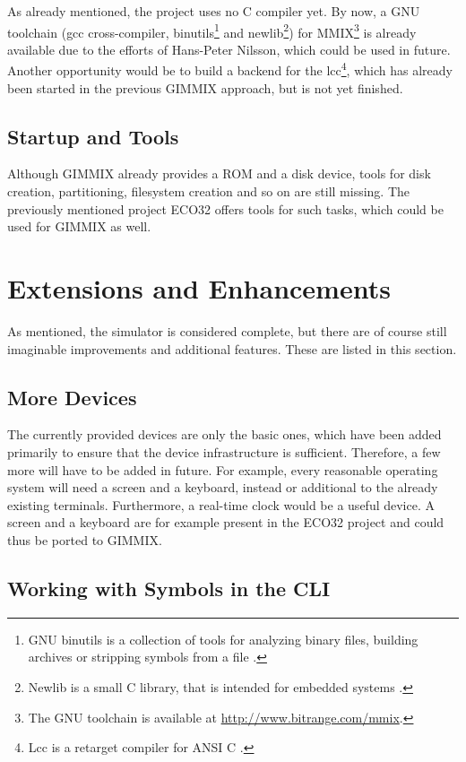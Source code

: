 As already mentioned, the project uses no C compiler yet. By now, a GNU toolchain (\gls{gcc} cross-compiler, binutils\footnote{GNU binutils is a collection of tools for analyzing binary files, building archives or stripping symbols from a file \citep{binutils}.} and newlib\footnote{Newlib is a small C library, that is intended for embedded systems \citep{newlib}.}) for MMIX\footnote{The GNU toolchain is available at \url{http://www.bitrange.com/mmix}.} is already available due to the efforts of Hans-Peter Nilsson, which could be used in future. Another opportunity would be to build a backend for the lcc\footnote{Lcc is a retarget compiler for ANSI C \citep{lcc}.}, which has already been started in the previous GIMMIX approach, but is not yet finished.

\subsection{Startup and Tools}

Although GIMMIX already provides a ROM and a disk device, tools for disk creation, partitioning, filesystem creation and so on are still missing. The previously mentioned project ECO32 offers tools for such tasks, which could be used for GIMMIX as well.

\section{Extensions and Enhancements}

As mentioned, the simulator is considered complete, but there are of course still imaginable improvements and additional features. These are listed in this section.

\subsection{More Devices}

The currently provided devices are only the basic ones, which have been added primarily to ensure that the device infrastructure is sufficient. Therefore, a few more will have to be added in future. For example, every reasonable operating system will need a screen and a keyboard, instead or additional to the already existing terminals. Furthermore, a real-time clock would be a useful device. A screen and a keyboard are for example present in the ECO32 project and could thus be ported to GIMMIX.

\subsection{Working with Symbols in the CLI}

